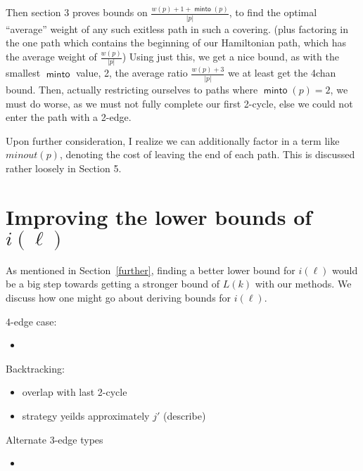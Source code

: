 \documentclass{article}
\theoremstyle{definition}
\DeclareMathOperator{\minto}{\bm{\mathsf{minto}}}
\begin{document}
{Then section 3 proves bounds on $\frac{w(p) + 1+ \minto(p)}{|p|}$, to find the optimal ``average'' weight of any such exitless path in such a covering. (plus factoring in the one path which contains the beginning of our Hamiltonian path, which has the average weight of $\frac{w(p)}{|p|}$) Using just this, we get a nice bound, as with the smallest $\minto$ value, 2, the average ratio $\frac{w(p)+3}{|p|}$ we at least get the 4chan bound. Then, actually restricting ourselves to paths where $\minto(p)=2$, we must do worse, as we must not fully complete our first 2-cycle, else we could not enter the path with a 2-edge.

Upon further consideration, I realize we can additionally factor in a term like $minout(p)$, denoting the cost of leaving the end of each path. This is discussed rather loosely in Section 5.

\section{Improving the lower bounds of \texorpdfstring{$i(\ell)$}{i(l)}}

As mentioned in Section~\ref{further}, finding a better lower bound for $i(\ell)$ would be a big step towards getting a stronger bound of $L(k)$ with our methods. We discuss how one might go about deriving bounds for $i(\ell)$.

4-edge case:
\begin{itemize}
    \item 
\end{itemize}

Backtracking: 
\begin{itemize}
    \item overlap with last 2-cycle
    \item strategy yeilds approximately $j'$ (describe)
\end{itemize}

Alternate 3-edge types
\begin{itemize}
    \item 
\end{itemize}}
\end{document}

